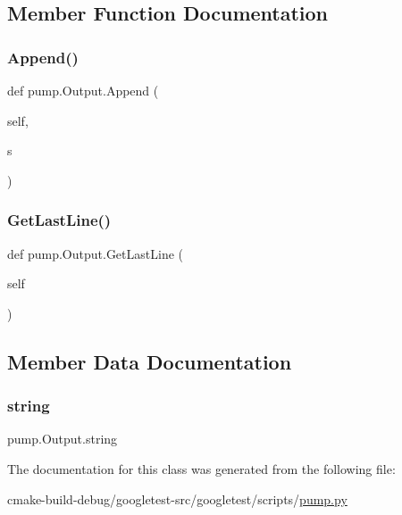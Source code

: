 \subsection{Member Function Documentation}
\mbox{\label{classpump_1_1Output_a6f284bb3f80e03594bc28286c695f5a7}} 
\subsubsection{\texorpdfstring{Append()}{Append()}}
{\footnotesize\ttfamily def pump.\+Output.\+Append (\begin{DoxyParamCaption}\item[{}]{self,  }\item[{}]{s }\end{DoxyParamCaption})}

\mbox{\label{classpump_1_1Output_a6ece94d24be171bae2a2234c052b4c58}} 
\subsubsection{\texorpdfstring{GetLastLine()}{GetLastLine()}}
{\footnotesize\ttfamily def pump.\+Output.\+Get\+Last\+Line (\begin{DoxyParamCaption}\item[{}]{self }\end{DoxyParamCaption})}



\subsection{Member Data Documentation}
\mbox{\label{classpump_1_1Output_a8786848ab3d235189379c449a446f883}} 
\subsubsection{\texorpdfstring{string}{string}}
{\footnotesize\ttfamily pump.\+Output.\+string}



The documentation for this class was generated from the following file\+:\begin{DoxyCompactItemize}
\item 
cmake-\/build-\/debug/googletest-\/src/googletest/scripts/\mbox{\hyperlink{pump_8py}{pump.\+py}}\end{DoxyCompactItemize}
